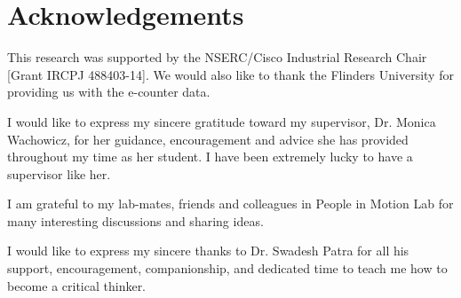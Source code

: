 \chapter*{Acknowledgements}

This research was supported by the NSERC/Cisco Industrial Research Chair [Grant IRCPJ 488403-14]. We would also like to thank the Flinders University for providing us with the e-counter data.

I would like to express my sincere gratitude toward my supervisor, Dr. Monica Wachowicz, for her guidance, encouragement and advice she has provided throughout my time as her student. I have been extremely lucky to have a supervisor like her.


I am grateful to my lab-mates, friends and colleagues in People in Motion Lab for many interesting discussions and sharing ideas. 

I would like to express my sincere thanks to Dr. Swadesh Patra for all his support, encouragement, companionship, and dedicated time to teach me how to become a critical thinker.


